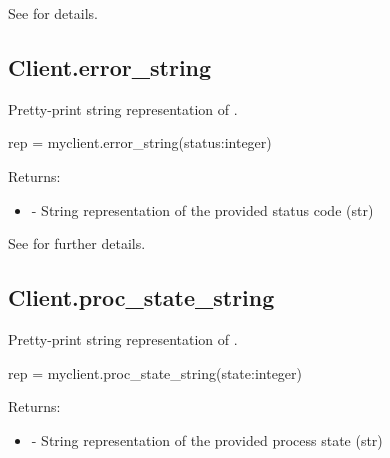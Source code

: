 See  for details.


\subsection{Client.error_string}

\summary

Pretty-print string representation of .

\format

\pyspecificstart
\begin{codepar}
rep = myclient.error_string(status:integer)
\end{codepar}
\pyspecificend

\begin{arglist}
\end{arglist}

Returns:
\begin{itemize}
    \item {} - String representation of the provided status code (str)
\end{itemize}

See  for further details.


\subsection{Client.proc_state_string}

\summary

Pretty-print string representation of .

\format

\pyspecificstart
\begin{codepar}
rep = myclient.proc_state_string(state:integer)
\end{codepar}
\pyspecificend

\begin{arglist}
\end{arglist}

Returns:
\begin{itemize}
    \item {} - String representation of the provided process state (str)
\end{itemize}

